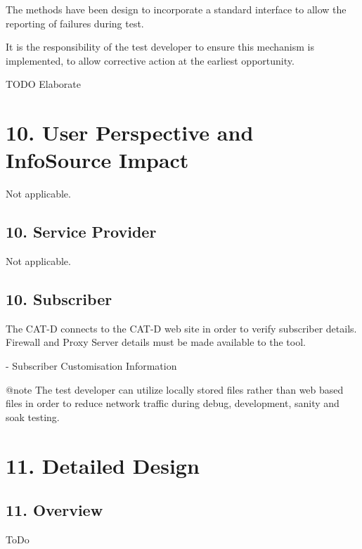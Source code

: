 \begin{DoxyVerb}The methods have been design to incorporate a standard interface to allow the 
reporting of failures during test.

It is the responsibility of the test developer to ensure this mechanism is implemented,
to allow corrective action at the earliest opportunity. 

TODO Elaborate
\end{DoxyVerb}
\hypertarget{index_sec_10}{}\section{10.	\+User Perspective and Info\+Source Impact}\label{index_sec_10}
\begin{DoxyVerb}Not applicable.
\end{DoxyVerb}
\hypertarget{index_sec_10_1}{}\subsection{10.	\+Service Provider}\label{index_sec_10_1}
\begin{DoxyVerb}Not applicable.
\end{DoxyVerb}
\hypertarget{index_sec_10_2}{}\subsection{10.	\+Subscriber}\label{index_sec_10_2}
\begin{DoxyVerb}The CAT-D connects to the CAT-D web site in order to verify subscriber details.  Firewall and Proxy Server details must be made available to the tool.

    - Subscriber Customisation Information

@note The test developer can utilize locally stored files rather than web based files in order to reduce network traffic during debug, development, sanity and soak testing.
\end{DoxyVerb}
\hypertarget{index_sec_11}{}\section{11.	\+Detailed Design}\label{index_sec_11}
\hypertarget{index_sec_11_1}{}\subsection{11.	\+Overview}\label{index_sec_11_1}
\begin{DoxyVerb}ToDo
\end{DoxyVerb}
